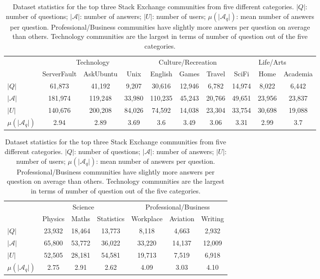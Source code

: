 \begin{table}[h]
 \centering
 \begin{subtable}{\linewidth}
 \setlength{\tabcolsep}{3pt}
   \begin{tabular}{l | c c c | c c c | c c c }
  \toprule
  &  \multicolumn{3}{c}{{Technology}} &
  \multicolumn{3}{c}{{Culture/Recreation}} &
  \multicolumn{3}{c}{{Life/Arts}} \\
  & ServerFault & AskUbuntu & Unix & English & Games & Travel & SciFi & Home & Academia \\ \midrule
$\vert Q \vert$ & 61,873 & 41,192 & 9,207 & 30,616 & 12,946 & 6,782 & 14,974 & 8,022 & 6,442  \\
$\vert  \mathcal{A} \vert$ & 181,974 & 119,248 & 33,980 & 110,235 & 45,243 & 20,766 & 49,651& 23,956 & 23,837 \\
$ \vert U \vert$ & 140,676 & 200,208 & 84,026 & 74,592 & 14,038 & 23,304 & 33,754 & 30,698 & 19,088 \\
$ \mu (\vert  \mathcal{A}_q \vert) $ & 2.94 & 2.89 & 3.69 & 3.6 & 3.49 & 3.06 & 3.31 & 2.99 & 3.7 \\
   \bottomrule
 \end{tabular}%
\end{subtable}\vspace{8mm}

\begin{subtable}{\linewidth}
\centering
 \begin{tabular}{l | c c c | c c c}
\toprule
&
\multicolumn{3}{c}{{Science}} &
\multicolumn{3}{c}{{Professional/Business}}\\
& Physics & Maths & Statistics & Workplace & Aviation & Writing \\ \midrule
$\vert Q \vert$ &  23,932 & 18,464 & 13,773 & 8,118 & 4,663 & 2,932 \\
$\vert  \mathcal{A} \vert$ & 65,800 & 53,772 & 36,022 & 33,220 & 14,137 & 12,009 \\
$ \vert U \vert$ & 52,505 & 28,181 & 54,581& 19,713 & 7,519 & 6,918 \\
$ \mu (\vert  \mathcal{A}_q \vert) $ & 2.75 & 2.91 & 2.62 & 4.09 & 3.03 & 4.10 \\
 \bottomrule
\end{tabular}
\end{subtable}
 \caption{ \label{tab:stats}Dataset statistics for the top three Stack Exchange communities from five different categories. $\vert Q \vert$: number of questions; $\vert  \mathcal{A} \vert$: number of answers; $ \vert U \vert $: number of users; $ \mu (\vert  \mathcal{A}_q \vert) $: mean number of answers per question. Professional/Business communities have slightly more answers per question on average than others. Technology communities are the largest in terms of number of question out of the five categories.}
\end{table}

